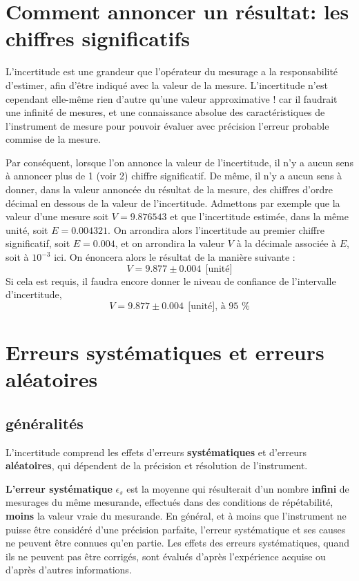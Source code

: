 \section{Comment annoncer un résultat: les chiffres significatifs}

L'incertitude est une grandeur que l'opérateur du mesurage a la responsabilité d'estimer, afin d'être indiqué avec la valeur de la mesure. L'incertitude n'est cependant elle-même rien d'autre qu'une valeur approximative ! car il faudrait une infinité de mesures, et une connaissance absolue des caractéristiques de l'instrument de mesure pour pouvoir évaluer avec précision l'erreur probable commise de la mesure.

Par conséquent, lorsque l'on annonce la valeur de l'incertitude, il n'y a aucun sens à annoncer plus de 1 (voir 2) chiffre significatif. De même, il n'y a aucun sens à donner, dans la valeur annoncée du résultat de la mesure, des chiffres d'ordre décimal en dessous de la valeur de l'incertitude. Admettons par exemple que la valeur d'une mesure soit $V=9.876543$ et que l'incertitude estimée, dans la même unité, soit $E=0.004321$. On arrondira alors l'incertitude au premier chiffre significatif, soit $E=0.004$, et on arrondira la valeur $V$ à la décimale associée à $E$, soit à $10^{-3}$ ici. On énoncera alors le résultat de la manière suivante :
$$
    V=9.877\pm0.004\ \ \text{[unité]}
$$
Si cela est requis, il faudra encore donner le niveau de confiance de l'intervalle d'incertitude,
$$
    V=9.877\pm0.004\ \ \text{[unité], à 95 \%}
$$

\section{Erreurs systématiques et erreurs aléatoires}

\subsection{généralités}

L'incertitude comprend les effets d'erreurs \textbf{systématiques} et d'erreurs \textbf{aléatoires}, qui dépendent de la précision et résolution de l'instrument.

\textbf{L'erreur systématique} $\epsilon_s$ est la moyenne qui résulterait d'un nombre \textbf{infini} de mesurages du même mesurande, effectués dans des conditions de répétabilité, \textbf{moins} la valeur vraie du mesurande. En général, et à moins que l'instrument ne puisse être considéré d'une précision parfaite, l'erreur systématique et ses causes ne peuvent être connues qu'en partie. Les effets des erreurs systématiques, quand ils ne peuvent pas être corrigés, sont évalués d'après l'expérience acquise ou d'après d'autres informations.

